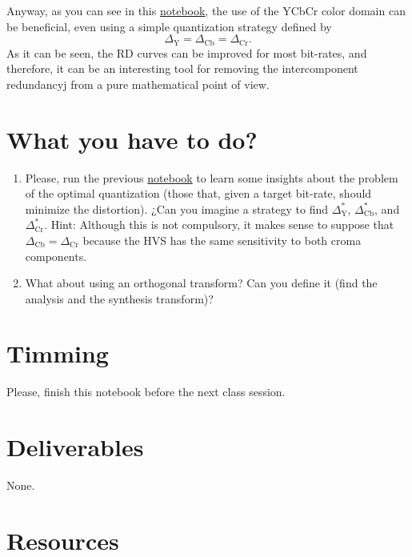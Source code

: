 Anyway, as you can see in this
\href{https://github.com/Sistemas-Multimedia/Sistemas-Multimedia.github.io/blob/master/study_guide/06-color_transform/performance.ipynb}{notebook},
the use of the YCbCr color domain can be beneficial, even using a
simple quantization strategy defined by
\begin{equation}
  \Delta_{\text{Y}} = \Delta_{\text{Cb}} = \Delta_{\text{Cr}}.
\end{equation}
As it can be seen, the RD curves can be improved for most bit-rates,
and therefore, it can be an interesting tool for removing the
intercomponent redundancyj from a pure mathematical point of view.

\section{What you have to do?}

\begin{enumerate}
\item Please, run the previous
  \href{https://github.com/Sistemas-Multimedia/Sistemas-Multimedia.github.io/blob/master/study_guide/06-color_transform/performance.ipynb}{notebook}
  to learn some insights about the problem of the optimal quantization
  (those that, given a target bit-rate, should minimize the
  distortion). ¿Can you imagine a strategy to find
  $\Delta^*_{\text{Y}}$, $\Delta^*_{\text{Cb}}$, and
  $\Delta^*_{\text{Cr}}$. Hint: Although this is not compulsory, it
  makes sense to suppose that
  $\Delta_{\text{Cb}} = \Delta_{\text{Cr}}$ because the HVS has the
  same sensitivity to both croma components.
\item What about using an orthogonal transform? Can you define it
  (find the analysis and the synthesis transform)?
\end{enumerate}
\section{Timming}

Please, finish this notebook before the next class session.

\section{Deliverables}

None.

\section{Resources}


